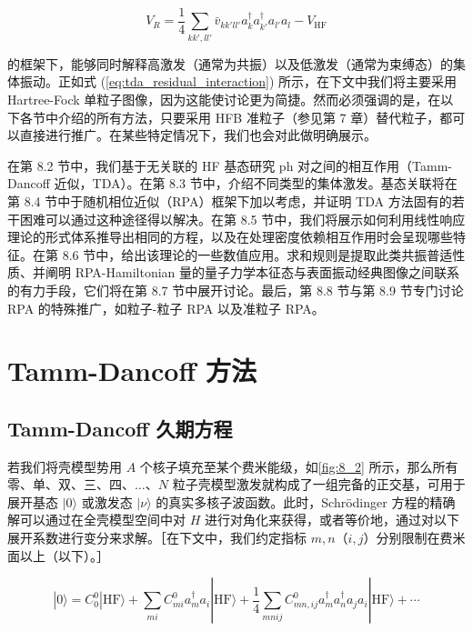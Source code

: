 \begin{equation}
V_{R}=\frac{1}{4}\sum_{kk',ll'}\bar{v}_{kk'll'}a^{\dagger}_{k}a^{\dagger}_{k'}a_{l'}a_{l}-V_{\text{HF}}\label{eq:tda_residual_interaction}
\end{equation}

的框架下，能够同时解释高激发（通常为共振）以及低激发（通常为束缚态）的集体振动。正如式 (\ref{eq:tda_residual_interaction})
所示，在下文中我们将主要采用 Hartree-Fock 单粒子图像，因为这能使讨论更为简捷。然而必须强调的是，在以下各节中介绍的所有方法，只要采用
HFB 准粒子（参见第 7 章）替代粒子，都可以直接进行推广。在某些特定情况下，我们也会对此做明确展示。

在第 8.2 节中，我们基于无关联的 HF 基态研究 ph 对之间的相互作用（Tamm-Dancoff 近似，TDA）。在第 8.3
节中，介绍不同类型的集体激发。基态关联将在第 8.4 节中于随机相位近似（RPA）框架下加以考虑，并证明 TDA 方法固有的若干困难可以通过这种途径得以解决。在第
8.5 节中，我们将展示如何利用线性响应理论的形式体系推导出相同的方程，以及在处理密度依赖相互作用时会呈现哪些特征。在第 8.6 节中，给出该理论的一些数值应用。求和规则是提取此类共振普适性质、并阐明
RPA-Hamiltonian 量的量子力学本征态与表面振动经典图像之间联系的有力手段，它们将在第 8.7 节中展开讨论。最后，第
8.8 节与第 8.9 节专门讨论 RPA 的特殊推广，如粒子-粒子 RPA 以及准粒子 RPA。

\section{Tamm-Dancoff 方法\label{sec:8.2_Tamm-Dancoff=0065B9=006CD5}\label{sec:8.2_Tamm-Dancoff=008FD1=004F3C}}

\subsection{Tamm-Dancoff 久期方程\label{subsec:8.2.1_Tamm-Dancoff=004E45=00671F=0065B9=007A0B}}

若我们将壳模型势用 $A$ 个核子填充至某个费米能级，如\ref{fig:8_2} 所示，那么所有零、单、双、三、四、$\dots$、$N$
粒子壳模型激发就构成了一组完备的正交基，可用于展开基态 $|0\rangle$ 或激发态 $|\nu\rangle$ 的真实多核子波函数。此时，Schrödinger
方程的精确解可以通过在全壳模型空间中对 $H$ 进行对角化来获得，或者等价地，通过对以下展开系数进行变分来求解。［在下文中，我们约定指标
$m,n$（$i,j$）分别限制在费米面以上（以下）。］

\begin{equation}
|0\rangle=C^{0}_{0}|\text{HF}\rangle+\sum_{mi}C^{0}_{mi}a^{\dagger}_{m}a_{i}|\text{HF}\rangle+\frac{1}{4}\sum_{mnij}C^{0}_{mn,ij}a^{\dagger}_{m}a^{\dagger}_{n}a_{j}a_{i}|\text{HF}\rangle+\cdots\label{eq:tda_expansion_ground}
\end{equation}

